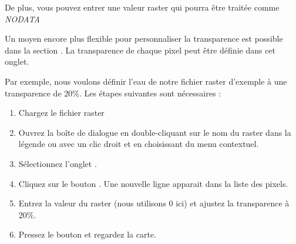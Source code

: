 De plus, vous pouvez entrer une valeur raster qui pourra être traitée comme {\em NODATA}

Un moyen encore plus flexible pour personnaliser la transparence est possible dans la section .
La transparence de chaque pixel peut être définie dans cet onglet.

Par exemple, nous voulons définir l'eau de notre fichier raster d'exemple
 à une transparence de 20\%. Les étapes suivantes sont nécessaires :
\begin{enumerate}
\item Chargez le fichier raster 
 \item Ouvrez la boîte de dialogue  en double-cliquant sur le nom du raster dans la légende ou avec un clic droit et en choisissant
 du menu contextuel.
 \item Sélectionnez l'onglet .
  \item \label{enum:add} Cliquez sur le bouton
. Une nouvelle ligne apparait dans la liste des pixels.
 \item \label{enum:transp} Entrez la valeur du raster (nous utilisons 0 ici)
et ajustez la transparence à 20\%.
 \item Pressez le bouton  et regardez la carte.
\end{enumerate}

